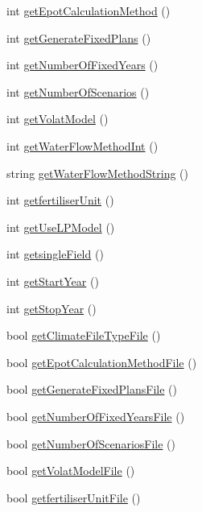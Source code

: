 \begin{DoxyCompactItemize}
int \hyperlink{classsystem_run_data_aa3ab9247fb8a885cac863cfdfe6a95b4}{getEpotCalculationMethod} ()
\item 
int \hyperlink{classsystem_run_data_add689a7a1fa40dbfa794536466d24cb5}{getGenerateFixedPlans} ()
\item 
int \hyperlink{classsystem_run_data_a454545fbb4cdd9d8b9d0bad56a9f5fb5}{getNumberOfFixedYears} ()
\item 
int \hyperlink{classsystem_run_data_a955a00df21e03282e566a1e10427163f}{getNumberOfScenarios} ()
\item 
int \hyperlink{classsystem_run_data_a304e3a7e901e7cbf8ed3f3b4f303bd01}{getVolatModel} ()
\item 
int \hyperlink{classsystem_run_data_afd44d6fdc044cecfd690fc7a58b8e91b}{getWaterFlowMethodInt} ()
\item 
string \hyperlink{classsystem_run_data_afdc8faeeed036370c4f0b8cdb3f223f9}{getWaterFlowMethodString} ()
\item 
int \hyperlink{classsystem_run_data_a95304d474a911db98bbe7c74ec33d3b7}{getfertiliserUnit} ()
\item 
int \hyperlink{classsystem_run_data_a7da2ab14238e23a8296f7501074fc6bc}{getUseLPModel} ()
\item 
int \hyperlink{classsystem_run_data_a3037091d3a222cee278a26567a257065}{getsingleField} ()
\item 
int \hyperlink{classsystem_run_data_a203d5a5287e44fab5a9577f92158954f}{getStartYear} ()
\item 
int \hyperlink{classsystem_run_data_a8d7a02b4175e9e85c7b3ccdb2f425610}{getStopYear} ()
\item 
bool \hyperlink{classsystem_run_data_ad10f0338c8987aa92808b403f33598b6}{getClimateFileTypeFile} ()
\item 
bool \hyperlink{classsystem_run_data_a1ddf8bf19ea2f4bfc5231c83a8a2dd02}{getEpotCalculationMethodFile} ()
\item 
bool \hyperlink{classsystem_run_data_a6773df3e0d7fe7d2d62168fcfafe2390}{getGenerateFixedPlansFile} ()
\item 
bool \hyperlink{classsystem_run_data_ac690137ca54725acdce110831765aef7}{getNumberOfFixedYearsFile} ()
\item 
bool \hyperlink{classsystem_run_data_af004dbf4820434569dfc2895113bcf01}{getNumberOfScenariosFile} ()
\item 
bool \hyperlink{classsystem_run_data_af63a2cfcdbf87113cd04e76bfc6ebdae}{getVolatModelFile} ()
\item 
bool \hyperlink{classsystem_run_data_a24fd3d78d123a7594f9dd6e578a7586a}{getfertiliserUnitFile} ()

\end{DoxyCompactItemize}
